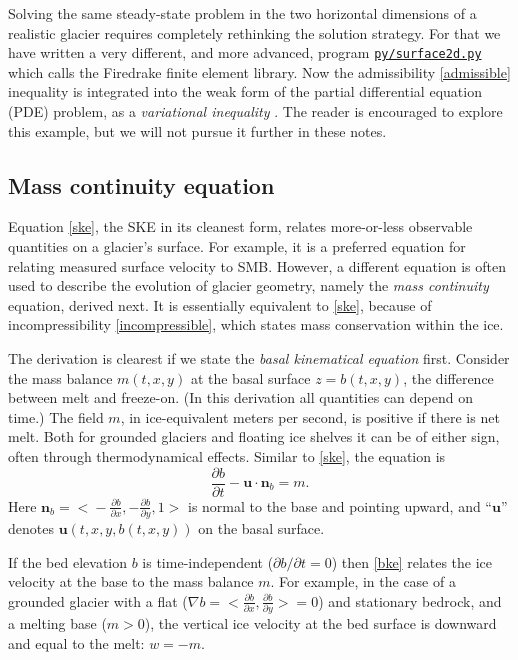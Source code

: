 \documentclass[letterpaper,final,12pt,reqno]{amsart}
\newcommand{\bn}{\mathbf{n}}
\newcommand{\bu}{\mathbf{u}}
\newcommand{\grad}{\nabla}
\begin{document}
Solving the same steady-state problem in the two horizontal dimensions of a realistic glacier requires completely rethinking the solution strategy.  For that we have written a very different, and more advanced, program \href{https://github.com/bueler/mccarthy/blob/master/py/surface2d.py}{\texttt{py/surface2d.py}} which calls the Firedrake finite element library.  Now the admissibility \eqref{admissible} inequality is integrated into the weak form of the partial differential equation (PDE) problem, as a \emph{variational inequality} \cite[Chapter 12, and references therein]{Bueler2021}.  The reader is encouraged to explore this example, but we will not pursue it further in these notes.

\subsection*{Mass continuity equation}  Equation \eqref{ske}, the SKE in its cleanest form, relates more-or-less observable quantities on a glacier's surface.  For example, it is a preferred equation for relating measured surface velocity to SMB.  However, a different equation is often used to describe the evolution of glacier geometry, namely the \emph{mass continuity} equation, derived next.  It is essentially equivalent to \eqref{ske}, because of incompressibility \eqref{incompressible}, which states mass conservation within the ice.

The derivation is clearest if we state the \emph{basal kinematical equation} first.  Consider the mass balance $m(t,x,y)$ at the basal surface $z=b(t,x,y)$, the difference between melt and freeze-on.  (In this derivation all quantities can depend on time.)  The field $m$, in ice-equivalent meters per second, is positive if there is net melt.  Both for grounded glaciers and floating ice shelves it can be of either sign, often through thermodynamical effects.  Similar to \eqref{ske}, the equation is
\begin{equation}
\frac{\partial b}{\partial t} - \bu \cdot \bn_b = m.  \label{bke}
\end{equation}
Here $\bn_b = \big<-\frac{\partial b}{\partial x}, -\frac{\partial b}{\partial y}, 1\big>$ is normal to the base and pointing upward, and ``$\bu$'' denotes $\bu(t,x,y,b(t,x,y))$ on the basal surface.

If the bed elevation $b$ is time-independent ($\partial b/\partial t=0$) then \eqref{bke} relates the ice velocity at the base to the mass balance $m$.  For example, in the case of a grounded glacier with a flat ($\grad b=\big<\frac{\partial b}{\partial x},\frac{\partial b}{\partial y}\big>=0$) and stationary bedrock, and a melting base ($m>0$), the vertical ice velocity at the bed surface is downward and equal to the melt: $w=-m$.
\end{document}
